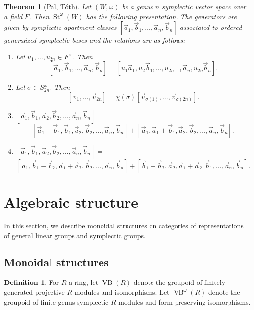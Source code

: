 \documentclass[11pt,letterpaper]{amsart}
\DeclareMathOperator{\VB}{VB}
\numberwithin{theoremcounter}{section}
\newtheorem{theorem}[theoremauto]{Theorem}
\theoremstyle{definition}
\newtheorem{definition}[Defauto]{Definition}
\theoremstyle{remark}
\DeclareMathOperator{\St}{St}
\begin{document}
\begin{theorem}[Pal, T\'oth] \label{SympPres}
    Let $(W,\omega)$ be a genus $n$ symplectic vector space over a field $F$. Then $\St^\omega(W)$ has the following presentation. The generators are given by
    symplectic apartment classes $[\vec a_1,\vec b_1,\ldots,\vec a_n,\vec b_n]$ associated to ordered generalized symplectic  bases and the relations are as follows: 
\begin{enumerate}
   \item Let $u_1,\ldots,u_{2n} \in F^\times$. Then $$[\vec a_1,\vec b_1, \ldots,\vec a_n,\vec b_n] =[u_1 \vec a_1,u_2 \vec b_1, \ldots,u_{2n-1} \vec a_n, u_{2n} \vec b_n].$$
     \item Let $\sigma \in S^{\omega}_{2n}$.  Then
     $$[\vec v_1, \ldots,\vec v_{2n}]=\chi(\sigma)[\vec v_{\sigma(1)}, \ldots,\vec v_{\sigma(2n)}].$$ 
     \item    %
     $ [\vec a_1,\vec b_1, \vec a_2, \vec b_2,\ldots,\vec a_n,\vec b_n  ]=$ $$[\vec a_1+\vec b_1,\vec b_1, \vec a_2,\vec b_2,\ldots,\vec a_n,\vec b_n  ]+[\vec a_1,\vec a_1+\vec b_1, \vec a_2, \vec b_2,\ldots,\vec a_n,\vec b_n  ].$$
     \item $ [\vec a_1,\vec b_1, \vec a_2, \vec b_2,\ldots,\vec a_n,\vec b_n  ]=$  $$ [\vec a_1,\vec b_1-\vec b_2, \vec a_1+\vec a_2, \vec b_2,\ldots,\vec a_n,\vec b_n  ]+[\vec b_1-\vec b_2,\vec a_2, \vec a_1+\vec a_2, \vec b_1,\ldots,\vec a_n,\vec b_n  ].$$
\end{enumerate}
\end{theorem}



\section{Algebraic structure}
In this section, we describe monoidal structures on categories of representations of general linear groups and symplectic groups. 

\label{DuoidalSection}
\subsection{Monoidal structures}

\begin{definition}
    For $R$ a ring, let $\VB(R)$ denote the groupoid of finitely generated projective $R$-modules and isomorphisms. Let $\VB^\omega(R)$ denote the groupoid of finite genus symplectic $R$-modules and form-preserving isomorphisms.
\end{definition}
\end{document}
